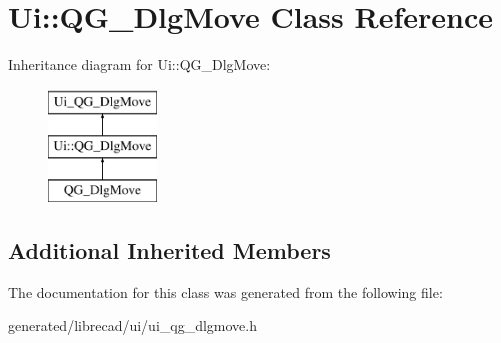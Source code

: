 \hypertarget{classUi_1_1QG__DlgMove}{\section{Ui\-:\-:Q\-G\-\_\-\-Dlg\-Move Class Reference}
\label{classUi_1_1QG__DlgMove}
}
Inheritance diagram for Ui\-:\-:Q\-G\-\_\-\-Dlg\-Move\-:\begin{figure}[H]
\begin{center}
\leavevmode
\includegraphics[height=3.000000cm]{classUi_1_1QG__DlgMove}
\end{center}
\end{figure}
\subsection*{Additional Inherited Members}


The documentation for this class was generated from the following file\-:\begin{DoxyCompactItemize}
\item 
generated/librecad/ui/ui\-\_\-qg\-\_\-dlgmove.\-h\end{DoxyCompactItemize}
